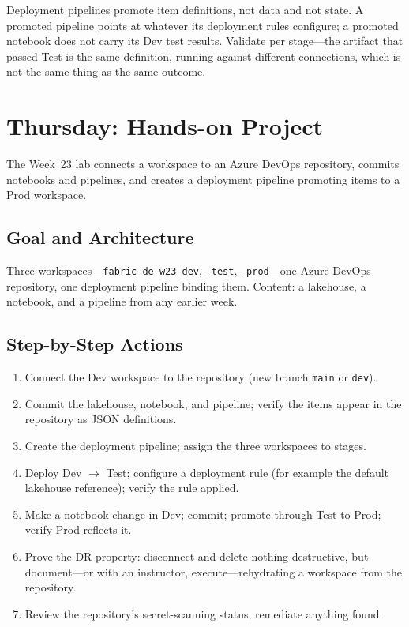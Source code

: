 \begin{pitfall}
Deployment pipelines promote item definitions, not data and not state. A promoted pipeline points at whatever its deployment rules configure; a promoted notebook does not carry its Dev test results. Validate per stage---the artifact that passed Test is the same definition, running against different connections, which is not the same thing as the same outcome.
\end{pitfall}

\section{Thursday: Hands-on Project}
The Week~23 lab connects a workspace to an Azure DevOps repository, commits notebooks and pipelines, and creates a deployment pipeline promoting items to a Prod workspace.

\subsection{Goal and Architecture}
Three workspaces---\texttt{fabric-de-w23-dev}, \texttt{-test}, \texttt{-prod}---one Azure DevOps repository, one deployment pipeline binding them. Content: a lakehouse, a notebook, and a pipeline from any earlier week.

\subsection{Step-by-Step Actions}
\begin{enumerate}
    \item Connect the Dev workspace to the repository (new branch \texttt{main} or \texttt{dev}).
    \item Commit the lakehouse, notebook, and pipeline; verify the items appear in the repository as JSON definitions.
    \item Create the deployment pipeline; assign the three workspaces to stages.
    \item Deploy Dev $\rightarrow$ Test; configure a deployment rule (for example the default lakehouse reference); verify the rule applied.
    \item Make a notebook change in Dev; commit; promote through Test to Prod; verify Prod reflects it.
    \item Prove the DR property: disconnect and delete nothing destructive, but document---or with an instructor, execute---rehydrating a workspace from the repository.
    \item Review the repository's secret-scanning status; remediate anything found.
\end{enumerate}


